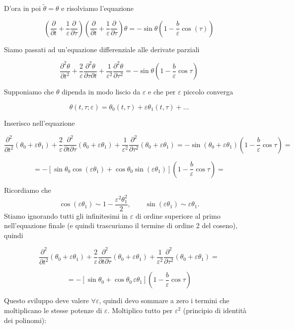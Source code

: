 D'ora in poi $\tilde{\theta}=\theta$ e risolviamo l'equazione

\[
\left(
\frac{\partial}{\partial t}
+
\frac{1}{\varepsilon}\frac{\partial}{\partial \tau}
\right)
\left(
\frac{\partial}{\partial t}
+
\frac{1}{\varepsilon}\frac{\partial}{\partial \tau}
\right)
\theta
=
-\sin\theta
\left(
1-\frac{b}{\varepsilon}\cos(\tau)
\right)
\]

Siamo passati ad un'equazione differenziale alle derivate parziali

\[
\frac{\partial^2\theta}{\partial t^2}
+
\frac{2}{\varepsilon}
\frac{\partial^2\theta}{\partial \tau \partial t}
+
\frac{1}{\varepsilon^2}
\frac{\partial^2\theta}{\partial \tau^2}
=
-\sin\theta
\left(
1-\frac{b}{\varepsilon}\cos\tau
\right)
\]

Supponiamo che $\theta$ dipenda in modo liscio da $\varepsilon$ e che per $\varepsilon$ piccolo converga

\[
\theta(t,\tau;\varepsilon)
=
\theta_0(t,\tau)
+
\varepsilon \theta_1(t,\tau)
+
\ldots
\]

Inserisco nell'equazione

\[
\frac{\partial^2}{\partial t^2}(\theta_0+\varepsilon\theta_1)
+
\frac{2}{\varepsilon}
\frac{\partial^2}{\partial t\partial\tau}
(\theta_0+\varepsilon\theta_1)
+
\frac{1}{\varepsilon^2}
\frac{\partial^2}{\partial \tau^2}
(\theta_0+\varepsilon\theta_1)
=
-\sin(\theta_0+\varepsilon\theta_1)
\left(
1-\frac{b}{\varepsilon}\cos\tau
\right)
=
\]

\[
=
-
\left[
\sin\theta_0 \cos(\varepsilon\theta_1)
+
\cos\theta_0 \sin(\varepsilon\theta_1)
\right]
\left(
1-\frac{b}{\varepsilon}\cos\tau
\right)
=
\]

Ricordiamo che
\[
\cos(\varepsilon\theta_1)\sim 1-\frac{\varepsilon^2\theta_1^2}{2},
\qquad
\sin(\varepsilon\theta_1)\sim \varepsilon\theta_1.
\]
Stiamo ignorando tutti gli infinitesimi in $\varepsilon$ di ordine superiore al primo nell'equazione finale (e quindi trascuriamo il termine di ordine 2 del coseno), quindi

\[
\frac{\partial^2}{\partial t^2}(\theta_0+\varepsilon\theta_1)
+
\frac{2}{\varepsilon}
\frac{\partial^2}{\partial t\partial\tau}
(\theta_0+\varepsilon\theta_1)
+
\frac{1}{\varepsilon^2}
\frac{\partial^2}{\partial \tau^2}
(\theta_0+\varepsilon\theta_1)
=
\]

\[
=
-
\left[
\sin\theta_0
+
\cos\theta_0\,\varepsilon\theta_1
\right]
\left(
1-\frac{b}{\varepsilon}\cos\tau
\right)
\]

Questo sviluppo deve valere $\forall \varepsilon$, quindi devo sommare a zero i termini che moltiplicano le stesse potenze di $\varepsilon$. Moltiplico tutto per $\varepsilon^2$ (principio di identità dei polinomi):

